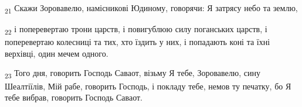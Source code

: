 \begin{tcolorbox}
\textsubscript{21} Скажи Зоровавелю, намісникові Юдиному, говорячи: Я затрясу небо та землю,
\end{tcolorbox}
\begin{tcolorbox}
\textsubscript{22} і поперевертаю трони царств, і повигублюю силу поганських царств, і поперевертаю колесниці та тих, хто їздить у них, і попадають коні та їхні верхівці, один мечем одного.
\end{tcolorbox}
\begin{tcolorbox}
\textsubscript{23} Того дня, говорить Господь Саваот, візьму Я тебе, Зоровавелю, сину Шеалтіїлів, Мій рабе, говорить Господь, і покладу тебе, немов ту печатку, бо Я тебе вибрав, говорить Господь Саваот.
\end{tcolorbox}
